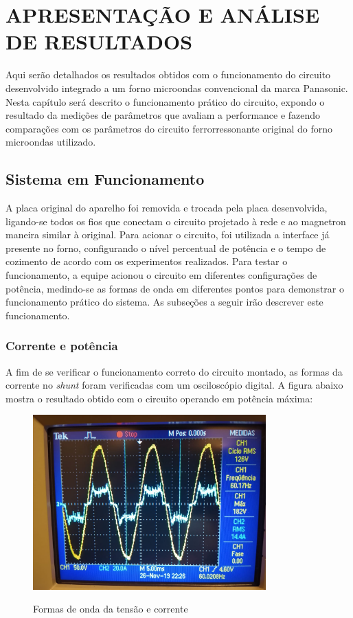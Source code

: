 
\chapter{APRESENTAÇÃO E ANÁLISE DE RESULTADOS}

Aqui serão detalhados os resultados obtidos com o funcionamento do circuito desenvolvido integrado a um forno microondas convencional da marca Panasonic. Nesta capítulo será descrito o funcionamento prático do circuito, expondo o resultado da medições de parâmetros que avaliam a performance e fazendo comparações com os parâmetros do circuito ferrorressonante original do forno microondas utilizado.


\section{Sistema em Funcionamento}
A placa original do aparelho foi removida e trocada pela placa desenvolvida, ligando-se todos os fios que conectam o circuito projetado à rede e ao magnetron maneira similar à original. Para acionar o circuito, foi utilizada a interface já presente no forno, configurando o nível percentual de potência e o tempo de cozimento de acordo com os experimentos realizados. Para testar o funcionamento, a equipe acionou o circuito em diferentes configurações de potência, medindo-se as formas de onda em diferentes pontos para demonstrar o funcionamento prático do sistema. As subseções a seguir irão descrever este funcionamento.

\subsection{Corrente e potência}
A fim de se verificar o funcionamento correto do circuito montado, as formas da corrente no \textit{shunt} foram verificadas com um osciloscópio digital. A figura abaixo mostra o resultado obtido com o circuito operando em potência máxima:

\begin{figure}[H]
    \centering
    \caption{Formas de onda da tensão e corrente}
    \includegraphics[width=0.8\textwidth]{./dados/figuras/onda_corrente}
    \label{fig:figura-onda_corrente}
\end{figure}

